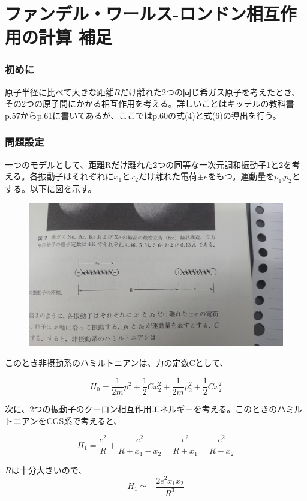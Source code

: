 \documentclass{jsarticle}
\begin{document}
\part{ファンデル・ワールス-ロンドン相互作用の計算 補足}
	\section{初めに}
	原子半径に比べて大きな距離$R$だけ離れた2つの同じ希ガス原子を考えたとき、その2つの原子間にかかる相互作用を考える。詳しいことはキッテルの教科書p.57からp.61に書いてあるが、ここではp.60の式(4)と式(6)の導出を行う。

	\section{問題設定}
	一つのモデルとして、距離Rだけ離れた2つの同等な一次元調和振動子1と2を考える。各振動子はそれぞれに$x_{1}$と$x_{2}$だけ離れた電荷$\pm e$をもつ。運動量を$p_{1}$,$p_2$とする。以下に図を示す。\\
	\begin{figure}[H]
		\centering
		\includegraphics[width=0.7\linewidth]{DSC_0001}
		\caption{}
		\label{fig:dsc0001}
	\end{figure}

	このとき非摂動系のハミルトニアンは、力の定数Cとして、

		\begin{equation}
			H_{0}=\frac{1}{2m}p_{1}^{2}+\frac{1}{2}Cx_{2}^{2}+\frac{1}{2m}p_{2}^{2}+\frac{1}{2}Cx_{2}^{2}
		\end{equation}

	次に、2つの振動子のクーロン相互作用エネルギーを考える。このときのハミルトニアンをCGS系で考えると、

		\begin{equation}
			H_{1}=\frac{e^{2}}{R}+\frac{e^{2}}{R+x_{1}-x_{2}}-\frac{e^{2}}{R+x_{1}}-\frac{e^{2}}{R-x_{2}}
		\end{equation}

	$R$は十分大きいので、
		\begin{equation}
			H_{1}\simeq-\frac{2e^{2}x_{1}x_{2}}{R^{3}}
		\end{equation}
\end{document}
